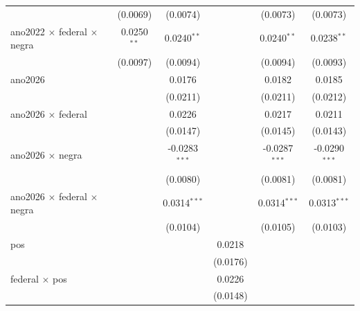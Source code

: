 \begin{tabular}{lccccc}
                                             & (0.0069)              & (0.0074)        &                 & (0.0073)           & (0.0073)\\   
   ano2022 $\times$ federal $\times$ negra   & 0.0250$^{**}$         & 0.0240$^{**}$   &                 & 0.0240$^{**}$      & 0.0238$^{**}$\\   
                                             & (0.0097)              & (0.0094)        &                 & (0.0094)           & (0.0093)\\   
   ano2026                                   &                       & 0.0176          &                 & 0.0182             & 0.0185\\   
                                             &                       & (0.0211)        &                 & (0.0211)           & (0.0212)\\   
   ano2026 $\times$ federal                  &                       & 0.0226          &                 & 0.0217             & 0.0211\\   
                                             &                       & (0.0147)        &                 & (0.0145)           & (0.0143)\\   
   ano2026 $\times$ negra                    &                       & -0.0283$^{***}$ &                 & -0.0287$^{***}$    & -0.0290$^{***}$\\   
                                             &                       & (0.0080)        &                 & (0.0081)           & (0.0081)\\   
   ano2026 $\times$ federal $\times$ negra   &                       & 0.0314$^{***}$  &                 & 0.0314$^{***}$     & 0.0313$^{***}$\\   
                                             &                       & (0.0104)        &                 & (0.0105)           & (0.0103)\\   
   pos                                       &                       &                 & 0.0218          &                    &   \\   
                                             &                       &                 & (0.0176)        &                    &   \\   
   federal $\times$ pos                      &                       &                 & 0.0226          &                    &   \\   
                                             &                       &                 & (0.0148)        &                    &   \\   

\end{tabular}
